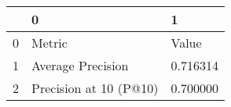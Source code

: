 \begin{tabular}{lll}
\toprule
 & 0 & 1 \\
\midrule
0 & Metric & Value \\
1 & Average Precision & 0.716314 \\
2 & Precision at 10 (P@10) & 0.700000 \\
\bottomrule
\end{tabular}
